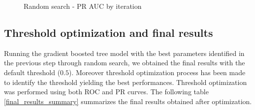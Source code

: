 \documentclass[LaM,binding=0.6cm, english]{sapthesis}
\begin{document}
\begin{figure}[!ht]
  \centering
  \hfill
  \caption{Random search - PR AUC by iteration}
\end{figure}


\subsection{Threshold optimization and final results}

Running the gradient boosted tree model with the best parameters identified in the previous step through random search, we obtained the final results with the default threshold ($0.5$). Moreover threshold optimization process has been made to identify the threshold yielding the best performances. Threshold optimization was performed using both ROC and PR curves. The following table \ref{final_results_summary} summarizes the final results obtained after optimization.
\end{document}
